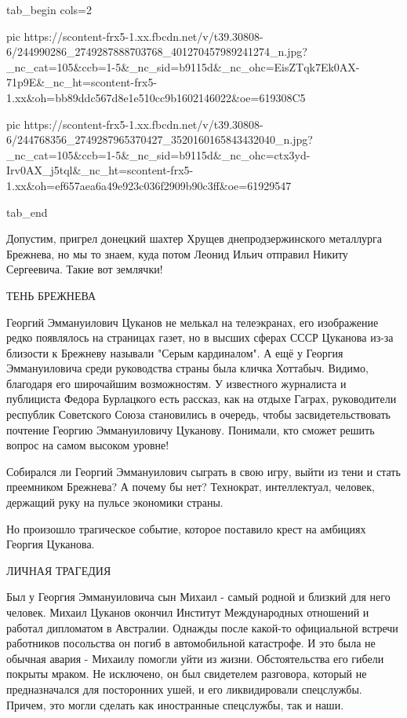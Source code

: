 \ifcmt
  tab_begin cols=2

     pic https://scontent-frx5-1.xx.fbcdn.net/v/t39.30808-6/244990286_2749287888703768_401270457989241274_n.jpg?_nc_cat=105&ccb=1-5&_nc_sid=b9115d&_nc_ohc=EisZTqk7Ek0AX-71p9E&_nc_ht=scontent-frx5-1.xx&oh=bb89ddc567d8e1e510cc9b1602146022&oe=619308C5

     pic https://scontent-frx5-1.xx.fbcdn.net/v/t39.30808-6/244768356_2749287965370427_3520160165843432040_n.jpg?_nc_cat=105&ccb=1-5&_nc_sid=b9115d&_nc_ohc=ctx3yd-Irv0AX_j5tql&_nc_ht=scontent-frx5-1.xx&oh=ef657aea6a49e923c036f2909b90c3ff&oe=61929547

  tab_end
\fi

Допустим, пригрел донецкий шахтер Хрущев днепродзержинского металлурга
Брежнева, но мы то знаем, куда потом Леонид Ильич отправил Никиту Сергеевича.
Такие вот землячки!

ТЕНЬ БРЕЖНЕВА

Георгий Эммануилович Цуканов не мелькал на телеэкранах, его изображение редко
появлялось на страницах газет, но в высших сферах СССР Цуканова из-за близости
к Брежневу называли "Серым кардиналом". А ещё у Георгия Эммануиловича среди
руководства страны была кличка Хоттабыч. Видимо, благодаря его широчайшим
возможностям. У известного журналиста и публициста Федора Бурлацкого есть
рассказ, как на отдыхе Гаграх, руководители республик Советского Союза
становились в очередь, чтобы засвидетельствовать почтение Георгию Эммануиловичу
Цуканову. Понимали, кто сможет решить вопрос на самом высоком уровне!

Собирался ли Георгий Эммануилович  сыграть в свою игру, выйти из тени и стать
преемником Брежнева? А почему бы нет? Технократ, интеллектуал, человек,
держащий руку на пульсе экономики страны. 

Но произошло трагическое событие, которое поставило крест на амбициях Георгия
Цуканова.

ЛИЧНАЯ ТРАГЕДИЯ

Был у Георгия Эммануиловича сын Михаил - самый родной и близкий для него
человек. Михаил Цуканов окончил Институт Международных отношений и работал
дипломатом в Австралии. Однажды после какой-то официальной встречи работников
посольства он погиб в автомобильной катастрофе. И это была не обычная авария -
Михаилу помогли уйти из жизни. Обстоятельства его гибели покрыты мраком. Не
исключено, он был свидетелем разговора, который не предназначался для
посторонних ушей, и его ликвидировали спецслужбы. Причем, это могли сделать как
иностранные спецслужбы, так и наши.

